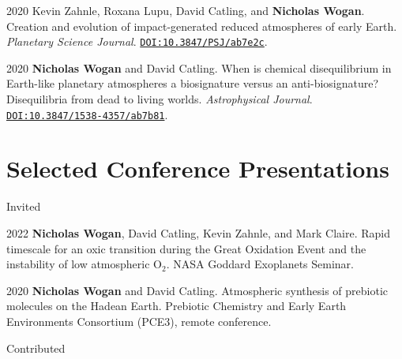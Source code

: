 \documentclass{article}
\begin{document}
\begin{cvlist}
\item[2020]
  Kevin Zahnle, Roxana Lupu, David Catling, and \textbf{Nicholas Wogan}. Creation and evolution of impact-generated reduced atmospheres of early Earth. \emph{Planetary Science Journal}. \href{https://doi.org/10.3847/PSJ/ab7e2c}{\nolinkurl{DOI:10.3847/PSJ/ab7e2c}}.
\item[2020]
  \textbf{Nicholas Wogan} and David Catling. When is chemical disequilibrium in Earth-like planetary atmospheres a biosignature versus an anti-biosignature? Disequilibria from dead to living worlds. \emph{Astrophysical Journal}. \href{https://doi.org/10.3847/1538-4357/ab7b81}{\nolinkurl{DOI:10.3847/1538-4357/ab7b81}}.
\end{cvlist}

\section{Selected Conference Presentations}

\noindent Invited

\begin{cvlist}
\item[2022]
  \textbf{Nicholas Wogan}, David Catling, Kevin Zahnle, and Mark Claire. Rapid timescale for an oxic transition during the Great Oxidation Event and the instability of low atmospheric O$_2$. NASA Goddard Exoplanets Seminar.
\item[2020] 
  \textbf{Nicholas Wogan} and David Catling. Atmospheric synthesis of prebiotic molecules on the Hadean Earth. Prebiotic Chemistry and Early Earth Environments Consortium (PCE3), remote conference.
\end{cvlist}

\noindent Contributed
\end{document}
